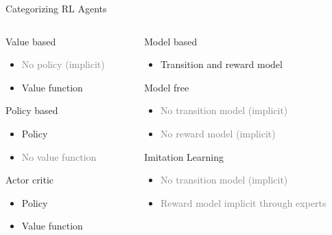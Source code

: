 \documentclass[11pt,table]{beamer}
\begin{document}
\begin{frame}{Categorizing RL Agents}


  \begin{columns}[T]
\begin{column}{0.5\textwidth}
 \begin{tcolorbox}[colframe=black, boxrule=1pt, arc=6mm]
\textcolor{red1}{Value based}
\begin{itemize}
\item \textcolor{gray}{No policy (implicit)}
\item Value function

\end{itemize}
\textcolor{red1}{Policy based}
\begin{itemize}
    \item Policy
\item \textcolor{gray}{No value function}
 
\end{itemize}
\textcolor{red1}{Actor critic}
\begin{itemize}
    \item Policy
\item Value function
 
\end{itemize}

 \end{tcolorbox}
\end{column}
\begin{column}{0.5\textwidth}
\begin{tcolorbox}[colframe=black, boxrule=1pt, arc=6mm]

\textcolor{red1}{Model based}
\begin{itemize}
    \item Transition and  reward model

\end{itemize}
\textcolor{red1}{Model free}

\begin{itemize}
    \item \textcolor{gray}{No transition model (implicit)}
    \item \textcolor{gray}{No  reward model (implicit)}

\end{itemize}
\textcolor{red1}{Imitation Learning}

\begin{itemize}
    \item \textcolor{gray}{No transition model (implicit)}
    \item \textcolor{gray}{Reward model implicit through experts}

\end{itemize}

\end{tcolorbox}
\end{column}
\end{columns}  
\end{frame}
\end{document}
